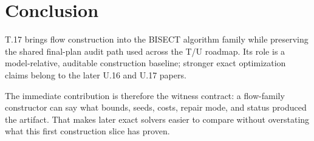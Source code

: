 \section{Conclusion}

T.17 brings flow construction into the BISECT algorithm family while preserving
the shared final-plan audit path used across the T/U roadmap. Its role is a
model-relative, auditable construction baseline; stronger exact optimization
claims belong to the later U.16 and U.17 papers.

The immediate contribution is therefore the witness contract: a flow-family
constructor can say what bounds, seeds, costs, repair mode, and status produced
the artifact. That makes later exact solvers easier to compare without
overstating what this first construction slice has proven.
